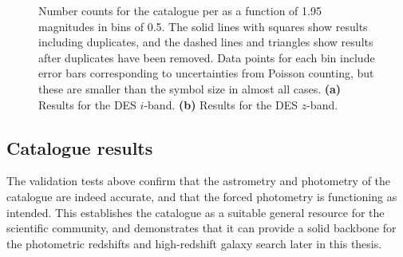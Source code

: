 \begin{figure}[tpb]
\centering
{}
\caption[Number counts in the \texorpdfstring{$i$}{}-band and \texorpdfstring{$z$}{}-band]{Number counts for the \DESVIDEO catalogue per \si{\sqdeg} as a function of \SI{1.95}{\arcsec} magnitudes in bins of \SI{0.5}{\mag}. The solid lines with squares show results including duplicates, and the dashed lines and triangles show results after duplicates have been removed. Data points for each bin include error bars corresponding to uncertainties from Poisson counting, but these are smaller than the symbol size in almost all cases. \textbf{(a)} Results for the DES $i$-band. \textbf{(b)} Results for the DES $z$-band.}
\label{fig:number_counts_DES}
\end{figure}


\subsection{Catalogue results}
The validation tests above confirm that the astrometry and photometry of the \DESVIDEO catalogue are indeed accurate, and that the forced photometry is functioning as intended. This establishes the catalogue as a suitable general resource for the scientific community, and demonstrates that it can provide a solid backbone for the photometric redshifts and high-redshift galaxy search later in this thesis. \par 

